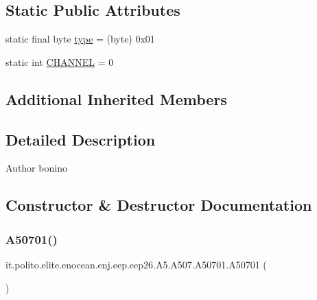 \subsection*{Static Public Attributes}
\begin{DoxyCompactItemize}
\item 
static final byte \hyperlink{classit_1_1polito_1_1elite_1_1enocean_1_1enj_1_1eep_1_1eep26_1_1_a5_1_1_a507_1_1_a50701_ac16e0f30050044fb64eabc3f397f8bb3}{type} = (byte) 0x01
\item 
static int \hyperlink{classit_1_1polito_1_1elite_1_1enocean_1_1enj_1_1eep_1_1eep26_1_1_a5_1_1_a507_1_1_a50701_ad38c033ad861ab09f3d340676ffe4f8c}{C\+H\+A\+N\+N\+EL} = 0
\end{DoxyCompactItemize}
\subsection*{Additional Inherited Members}


\subsection{Detailed Description}
\begin{DoxyAuthor}{Author}
bonino 
\end{DoxyAuthor}


\subsection{Constructor \& Destructor Documentation}
\hypertarget{classit_1_1polito_1_1elite_1_1enocean_1_1enj_1_1eep_1_1eep26_1_1_a5_1_1_a507_1_1_a50701_a0413444217671d11f7b39b3fafeeffdb}{}\label{classit_1_1polito_1_1elite_1_1enocean_1_1enj_1_1eep_1_1eep26_1_1_a5_1_1_a507_1_1_a50701_a0413444217671d11f7b39b3fafeeffdb} 
\subsubsection{\texorpdfstring{A50701()}{A50701()}}
{\footnotesize\ttfamily it.\+polito.\+elite.\+enocean.\+enj.\+eep.\+eep26.\+A5.\+A507.\+A50701.\+A50701 (\begin{DoxyParamCaption}{ }\end{DoxyParamCaption})}


